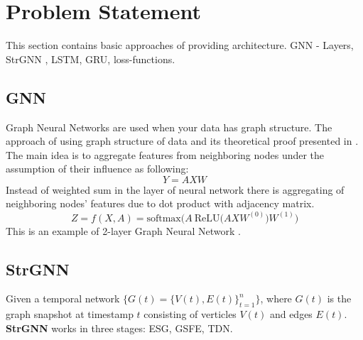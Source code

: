 \documentclass{article}
\begin{document}
\section{Problem Statement}
This section contains basic approaches of providing architecture. GNN - Layers, StrGNN \cite{DBLP:journals/corr/abs-2005-07427}, LSTM, GRU, loss-functions.
\subsection{GNN}
Graph Neural Networks are used when your data has graph structure. The approach of using graph structure of data and its theoretical proof presented in \cite{DBLP:journals/corr/KipfW16}. The main idea is to aggregate features from neighboring nodes under the assumption of their influence as following:
\begin{equation}
    Y = AXW
\end{equation}
Instead of weighted sum in the layer of neural network there is aggregating of neighboring nodes' features due to dot product with adjacency matrix.
\begin{equation}
    Z = f(X,A) = \text{softmax}\big(A~\text{ReLU}\big(AXW^{(0)}\big)W^{(1)}\big)
\end{equation}
This is an example of 2-layer Graph Neural Network \cite{DBLP:journals/corr/KipfW16}.
\subsection{StrGNN}
Given a temporal network $\{G(t) = \{V(t), E(t)\}^n_{t=1}\}$, where $G(t)$ is the graph snapshot at timestamp $t$ consisting of verticles $V(t)$ and edges $E(t)$.\\ \textbf{StrGNN} works in three stages: ESG, GSFE, TDN.
\end{document}
